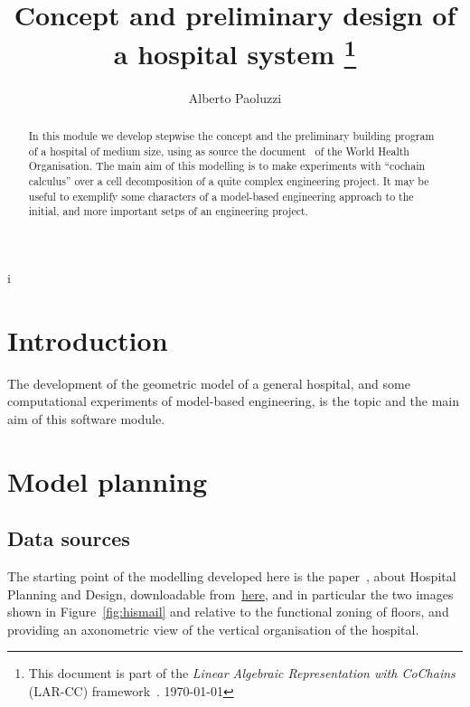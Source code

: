 i\documentclass[11pt,oneside]{article}    %
\title{Concept and preliminary design of a hospital system
\footnote{This document is part of the \emph{Linear Algebraic Representation with CoChains} (LAR-CC) framework~\cite{cclar-proj:2013:00}. \today}
}
\author{Alberto Paoluzzi}
\begin{document}
\maketitle
\nonstopmode
\tableofcontents

\begin{abstract}
In this module we develop stepwise the concept and the preliminary building program of a hospital of medium size, using as source the document~\cite{who:2013} of the World Health Organisation. The main aim of this modelling is to make experiments with ``cochain calculus'' over a cell decomposition of a quite complex engineering project. It may be useful to exemplify some characters of a model-based engineering approach to the initial, and more important setps of an engineering project.
\end{abstract}

\section{Introduction}

The development of the geometric model of a general hospital, and some computational experiments of model-based engineering, is the topic and the main aim of this software module.

\section{Model planning}

\subsection{Data sources}

The starting point of the modelling developed here is the paper~\cite{who:2013}, about Hospital Planning and Design, downloadable from~\href{http://paoluzzi.dia.uniroma3.it/web/hospital-planning-and-design.pdf}{here}, and in particular the two images shown in Figure~\ref{fig:hismail} and relative to the functional zoning of floors, and providing an axonometric view of the vertical organisation of the hospital.
\end{document}
